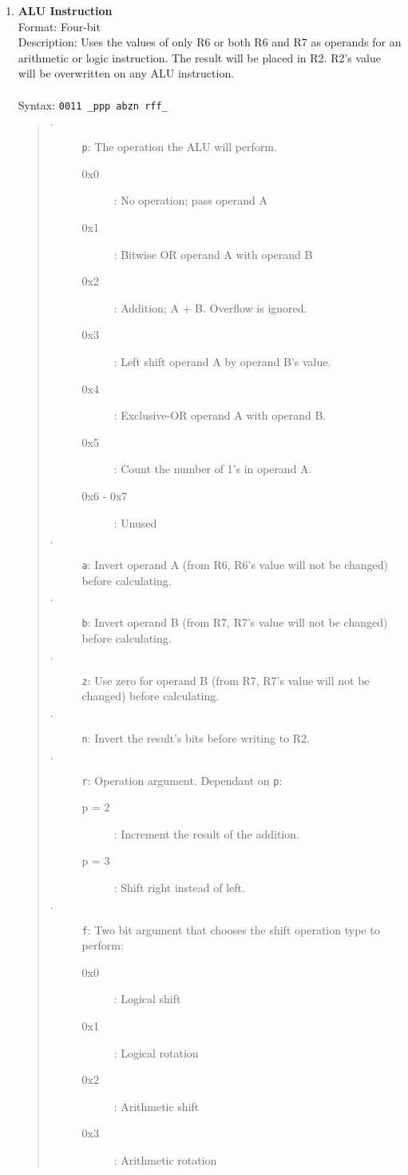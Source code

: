\documentclass{article}
\begin{document}
\begin{enumerate}
			\item \textbf{ALU Instruction}\\
			Format: Four-bit\\
			Description: Uses the values of only R6 or both R6 and R7 as operands for an arithmetic or logic instruction. The result will be placed in R2. R2's value will be overwritten on any ALU instruction.\\
			\\
			Syntax: \texttt{0011 \_ppp abzn rff\_}
			\begin{quote}
				\begin{description}
					\item[$\cdot$] \texttt{p}: The operation the ALU will perform.
					\begin{description}
						\item[0x0]: No operation; pass operand A
						\item[0x1]: Bitwise OR operand A with operand B
						\item[0x2]: Addition; A + B. Overflow is ignored.
						\item[0x3]: Left shift operand A by operand B's value.
						\item[0x4]: Exclusive-OR operand A with operand B.
						\item[0x5]: Count the number of 1's in operand A.
						\item[0x6 - 0x7]: Unused
					\end{description}
					\item[$\cdot$] \texttt{a}: Invert operand A (from R6, R6's value will not be changed) before calculating.
					\item[$\cdot$] \texttt{b}: Invert operand B (from R7, R7's value will not be changed) before calculating.
					\item[$\cdot$] \texttt{z}: Use zero for operand B (from R7, R7's value will not be changed) before calculating.
					\item[$\cdot$] \texttt{n}: Invert the result's bits before writing to R2.
					\item[$\cdot$] \texttt{r}: Operation argument. Dependant on \texttt{p}:
					\begin{description}
						\item[p = 2]: Increment the result of the addition.
						\item[p = 3]: Shift right instead of left.
					\end{description}
				    \item[$\cdot$] \texttt{f}: Two bit argument that chooses the shift operation type to perform:
				    \begin{description}
				    	\item[0x0]: Logical shift
				    	\item[0x1]: Logical rotation
				    	\item[0x2]: Arithmetic shift
				    	\item[0x3]: Arithmetic rotation
				    \end{description}
					

\end{description}
\end{quote}
\end{enumerate}
\end{document}
